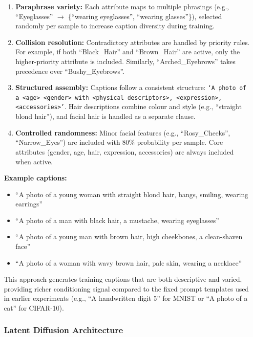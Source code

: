 \begin{enumerate}
    \item \textbf{Paraphrase variety:} Each attribute maps to multiple phrasings (e.g., ``Eyeglasses'' $\rightarrow$ \{``wearing eyeglasses'', ``wearing glasses''\}), selected randomly per sample to increase caption diversity during training.
    
    \item \textbf{Collision resolution:} Contradictory attributes are handled by priority rules. For example, if both ``Black\_Hair'' and ``Brown\_Hair'' are active, only the higher-priority attribute is included. Similarly, ``Arched\_Eyebrows'' takes precedence over ``Bushy\_Eyebrows''.
    
    \item \textbf{Structured assembly:} Captions follow a consistent structure: \texttt{`A photo of a <age> <gender> with <physical descriptors>, <expression>, <accessories>'}. Hair descriptions combine colour and style (e.g., ``straight blond hair''), and facial hair is handled as a separate clause.
    
    \item \textbf{Controlled randomness:} Minor facial features (e.g., ``Rosy\_Cheeks'', ``Narrow\_Eyes'') are included with 80\% probability per sample. Core attributes (gender, age, hair, expression, accessories) are always included when active.

\end{enumerate}

\textbf{Example captions:}
\begin{itemize}
    \item ``A photo of a young woman with straight blond hair, bangs, smiling, wearing earrings''
    \item ``A photo of a man with black hair, a mustache, wearing eyeglasses''
    \item ``A photo of a young man with brown hair, high cheekbones, a clean-shaven face''
    \item ``A photo of a woman with wavy brown hair, pale skin, wearing a necklace''
\end{itemize}

This approach generates training captions that are both descriptive and varied, providing richer conditioning signal compared to the fixed prompt templates used in earlier experiments (e.g., ``A handwritten digit 5'' for MNIST or ``A photo of a cat'' for CIFAR-10).

\subsubsection{Latent Diffusion Architecture}
\label{sec:celeba-latent-diffusion}


